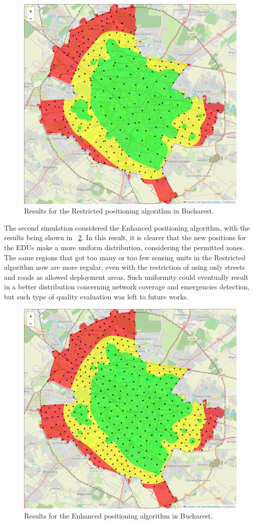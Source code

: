 \begin{refsection}
\begin{figure}[!ht]
  \centering
  \includegraphics[width=0.7\linewidth]{Chapters/5-AoM/img/bucaresti_restricted.png}
  \caption{Results for the Restricted positioning algorithm in Bucharest.}\label{fig:bucharest_restricted}
\end{figure}

The second simulation considered the Enhanced positioning algorithm, with the results being shown in \figurename~\ref{fig:bucharest_restricted_plus}. In this result, it is clearer that the new positions for the EDUs make a more uniform distribution, considering the permitted zones. The same regions that got too many or too few sensing units in the Restricted algorithm now are more regular, even with the restriction of using only streets and roads as allowed deployment areas. Such uniformity could eventually result in a better distribution concerning network coverage and emergencies detection, but such type of quality evaluation was left to future works. 

\begin{figure}[!ht]
  \centering
  \includegraphics[width=0.7\linewidth]{Chapters/5-AoM/img/bucaresti_restricted_plus.png}
  \caption{Results for the Enhanced positioning algorithm in Bucharest.}\label{fig:bucharest_restricted_plus}
\end{figure}


\end{refsection}
